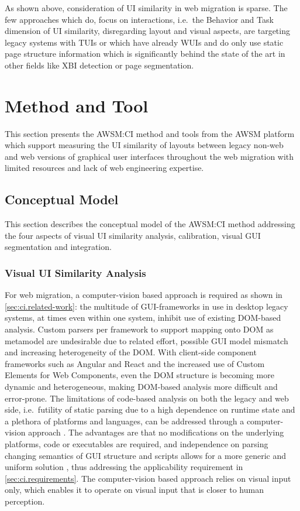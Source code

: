 As shown above, consideration of UI similarity in web migration is sparse.
The few approaches which do, focus on interactions, i.e.~the Behavior and Task dimension of UI similarity, disregarding layout and visual aspects, are targeting legacy systems with TUIs or which have already WUIs and do only use static page structure information which is significantly behind the state of the art in other fields like XBI detection or page segmentation.

\hypertarget{method-and-tool}{%
\section{Method and Tool}\label{method-and-tool}}

This section presents the AWSM:CI method and tools from the AWSM platform which support measuring the UI similarity of layouts between legacy non-web and web versions of graphical user interfaces throughout the web migration with limited resources and lack of web engineering expertise.

\hypertarget{conceptual-model}{%
\subsection{Conceptual Model}\label{conceptual-model}}

This section describes the conceptual model of the AWSM:CI method addressing the four aspects of visual UI similarity analysis, calibration, visual GUI segmentation and integration.

\hypertarget{sec:visual-analysis}{%
\subsubsection{Visual UI Similarity Analysis}\label{sec:visual-analysis}}

For web migration, a computer-vision based approach is required as shown in \cref{sec:ci.related-work}: the multitude of GUI-frameworks in use in desktop legacy systems, at times even within one system, inhibit use of existing DOM-based analysis.
Custom parsers per framework to support mapping onto DOM as metamodel are undesirable due to related effort, possible GUI model mismatch and increasing heterogeneity of the DOM.
With client-side component frameworks such as Angular and React and the increased use of Custom Elements for Web Components, even the DOM structure is becoming more dynamic and heterogeneous, making DOM-based analysis more difficult and error-prone.
The limitations of code-based analysis on both the legacy and web side, i.e.~futility of static parsing due to a high dependence on runtime state and a plethora of platforms and languages, can be addressed through a computer-vision approach \autocite{Grechanik2018}.
The advantages are that no modifications on the underlying platforms, code or executables are required, and independence on parsing changing semantics of GUI structure and scripts allows for a more generic and uniform solution \autocite{Grechanik2018}, thus addressing the applicability requirement in \cref{sec:ci.requirements}.
The computer-vision based approach relies on visual input only, which enables it to operate on visual input that is closer to human perception.

